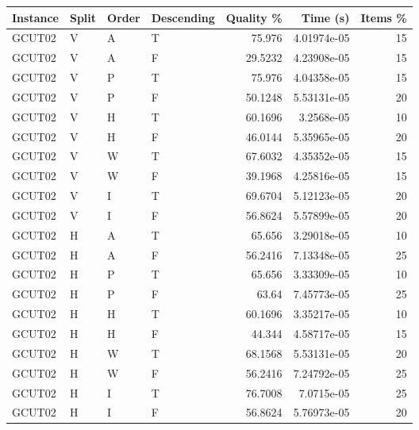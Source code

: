 \begin{tabular}{llllrrr}
    \hline
    Instance & Split & Order & Descending & Quality \% & Time (s)    & Items \% \\
    \hline
    GCUT02   & V     & A     & T          & 75.976     & 4.01974e-05 & 15       \\
    GCUT02   & V     & A     & F          & 29.5232    & 4.23908e-05 & 15       \\
    GCUT02   & V     & P     & T          & 75.976     & 4.04358e-05 & 15       \\
    GCUT02   & V     & P     & F          & 50.1248    & 5.53131e-05 & 20       \\
    GCUT02   & V     & H     & T          & 60.1696    & 3.2568e-05  & 10       \\
    GCUT02   & V     & H     & F          & 46.0144    & 5.35965e-05 & 20       \\
    GCUT02   & V     & W     & T          & 67.6032    & 4.35352e-05 & 15       \\
    GCUT02   & V     & W     & F          & 39.1968    & 4.25816e-05 & 15       \\
    GCUT02   & V     & I     & T          & 69.6704    & 5.12123e-05 & 20       \\
    GCUT02   & V     & I     & F          & 56.8624    & 5.57899e-05 & 20       \\
    GCUT02   & H     & A     & T          & 65.656     & 3.29018e-05 & 10       \\
    GCUT02   & H     & A     & F          & 56.2416    & 7.13348e-05 & 25       \\
    GCUT02   & H     & P     & T          & 65.656     & 3.33309e-05 & 10       \\
    GCUT02   & H     & P     & F          & 63.64      & 7.45773e-05 & 25       \\
    GCUT02   & H     & H     & T          & 60.1696    & 3.35217e-05 & 10       \\
    GCUT02   & H     & H     & F          & 44.344     & 4.58717e-05 & 15       \\
    GCUT02   & H     & W     & T          & 68.1568    & 5.53131e-05 & 20       \\
    GCUT02   & H     & W     & F          & 56.2416    & 7.24792e-05 & 25       \\
    GCUT02   & H     & I     & T          & 76.7008    & 7.0715e-05  & 25       \\
    GCUT02   & H     & I     & F          & 56.8624    & 5.76973e-05 & 20       \\

\end{tabular}
